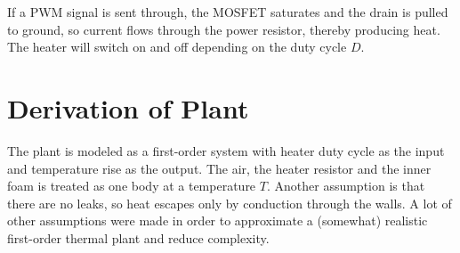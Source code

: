 \documentclass[10pt, a4paper, twocolumn]{article}
\begin{document}
	If a PWM signal is sent through, the MOSFET saturates and the drain is pulled to ground, so current flows through the power resistor, thereby producing heat. The heater will switch on and off depending on the duty cycle $D$.
	
	\section{Derivation of Plant}\label{apx:derivation}
	The plant is modeled as a first-order system with heater duty cycle as the input and temperature rise as the output. The air, the heater resistor and the inner foam is treated as one body at a temperature $T$. Another assumption is that there are no leaks, so heat escapes only by conduction through the walls. A lot of other assumptions were made in order to approximate a (somewhat) realistic first-order thermal plant and reduce complexity.
	
\end{document}
